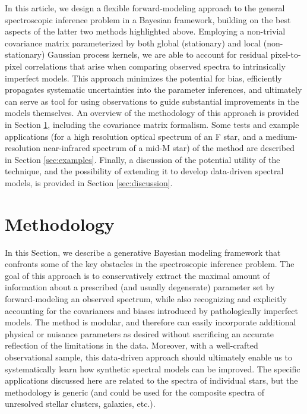 \documentclass[iop,floatfix,twocolappendix]{emulateapj}
\begin{document}
In this article, we design a flexible forward-modeling approach to the general spectroscopic 
inference problem in a Bayesian framework, building on the best aspects of the latter two methods 
highlighted above.  Employing a non-trivial covariance matrix parameterized by both global 
(stationary) and local (non-stationary) Gaussian process kernels, we are able to account for 
residual pixel-to-pixel correlations that arise when comparing observed spectra to intrinsically 
imperfect models.  This approach minimizes the potential for bias, efficiently propagates 
systematic uncertainties into the parameter inferences, and ultimately can serve as tool for using
observations to guide substantial improvements in the models themselves.  An overview of the 
methodology of this approach is provided in Section \ref{sec:method}, including the covariance 
matrix formalism.  Some tests and example applications (for a high resolution optical spectrum of 
an F star, and a medium-resolution near-infrared spectrum of a mid-M star) of the method are 
described in Section \ref{sec:examples}.  Finally, a discussion of the potential utility of the 
technique, and the possibility of extending it to develop data-driven spectral models, is provided 
in Section \ref{sec:discussion}.  \\



\section{Methodology} \label{sec:method}

In this Section, we describe a generative Bayesian modeling framework that confronts some of the 
key obstacles in the spectroscopic inference problem.  The goal of this approach is to 
conservatively extract the maximal amount of information about a prescribed (and usually 
degenerate) parameter set by forward-modeling an observed spectrum, while also recognizing and 
explicitly accounting for the covariances and biases introduced by pathologically imperfect 
models.  The method is modular, and therefore can easily incorporate additional physical or 
nuisance parameters as desired without sacrificing an accurate reflection of the limitations in the 
data.  Moreover, with a well-crafted observational sample, this data-driven approach should 
ultimately enable us to systematically learn how synthetic spectral models can be improved.  The 
specific applications discussed here are related to the spectra of individual stars, but the 
methodology is generic (and could be used for the composite spectra of unresolved stellar clusters, 
galaxies, etc.).  
\end{document}
